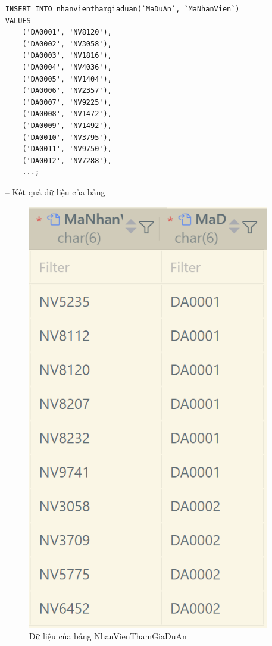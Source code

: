 \begin{itemize}
\begin{verbatim}
INSERT INTO nhanvienthamgiaduan(`MaDuAn`, `MaNhanVien`)
VALUES
    ('DA0001', 'NV8120'),
    ('DA0002', 'NV3058'),
    ('DA0003', 'NV1816'),
    ('DA0004', 'NV4036'),
    ('DA0005', 'NV1404'),
    ('DA0006', 'NV2357'),
    ('DA0007', 'NV9225'),
    ('DA0008', 'NV1472'),
    ('DA0009', 'NV1492'),
    ('DA0010', 'NV3795'),
    ('DA0011', 'NV9750'),
    ('DA0012', 'NV7288'),
    ...;
    \end{verbatim}
    \item [--] Kết quả dữ liệu của bảng
    \begin{figure}[H]
        \centering
        \includegraphics[width=0.4\linewidth]{content/images/data_nhanvien_duan.png}
        \caption{Dữ liệu của bảng NhanVienThamGiaDuAn} 
        \label{fig:data_nhanvien_duan}
    \end{figure}
\end{itemize}
\newpage
